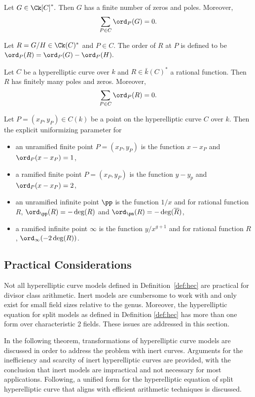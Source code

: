 \bt \label{thm:polyfinite} 
\cite[Theorem~29]{MenezesWuZuccherato_elementary_1996}  Let $G \in
\Ck[C]^{\ast}.$ Then $G$ has a finite number of zeros and poles. Moreover, 
$$ \sum_{P \in C} \ord_P(G) = 0.$$
\et

\bd \label{def:rationalorder}
\cite[Definition~30]{MenezesWuZuccherato_elementary_1996}  Let $R = G/H \in
\Ck(C)^{\ast}$ and $P \in C$. The order of $R$ at $P$ is defined to be
$\ord_P(R) = \ord_P(G) - \ord_P(H).$
\ed

\bt\label{thm:ratfinite} 
\cite[Adapted from Theorems~7.7.1 and~7.7.11]{Galbraith_PKC_2012} Let $C$ be a
hyperelliptic curve over $k$ and $R \in \bar{k}(C)^*$ a rational function. Then
$R$ has finitely many poles and zeros. Moreover, $$ \sum_{P \in C} \ord_P(R) =
0.$$
\et


\bl \label{lem:explicituni}
\cite[Adapted from Lemmas 10.1.21 and 10.1.22]{Galbraith_PKC_2012} Let $P =
(x_P,y_P) \in C(k)$ be a point on the hyperelliptic curve $C$ over $k$. Then the
explicit uniformizing parameter for \begin{itemize}
  \item an unramified finite point $P = (x_P,y_P)$ is the function $x - x_P$ and
  $\ord_P(x-x_P) = 1$,
  \item a ramified finite point $P = (x_P,y_P)$ is the function $y - y_p$ and
  $\ord_P(x-x_P) = 2$,
  \item an unramified infinite point $\pp$ is the function $1/x$ and for
  rational function $R$, $\ord_{\pp}(R) = -\deg(R)$ and $\ord_{\pn}(R) =
  -\deg(\overline{R})$,
  \item a ramified infinite point $\infty$ is the function $y/x^{g+1}$ and for
  rational function $R$, $\ord_{\infty}(-2\deg(R))$.
\end{itemize}
\el

\subsection{Practical Considerations}\label{sec:practicalConsiderations}
Not all hyperelliptic curve models defined in Definition~\ref{def:hec} are
practical for divisor class arithmetic. Inert models are cumbersome to work with
and only exist for small field sizes relative to the genus. Moreover, the
hyperelliptic equation for split models as defined in Definition \ref{def:hec} has
more than one form over characteristic 2 fields. These issues are addressed in
this section.

In the following theorem, transformations of hyperelliptic curve models are
discussed in order to address the problem with inert curves. Arguments for the
inefficiency and scarcity of inert hyperelliptic curves are provided, with the
conclusion that inert models are impractical and not necessary for most
applications. Following, a unified form for the hyperelliptic equation of split
hyperelliptic curve that aligns with efficient arithmetic techniques is
discussed.

